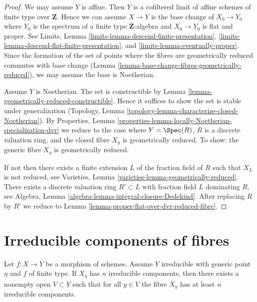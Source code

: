 \begin{proof}
We may assume $Y$ is affine. Then $Y$ is a cofiltered limit of affine
schemes of finite type over $\mathbf{Z}$.
Hence we can assume $X \to Y$ is the
base change of $X_0 \to Y_0$ where $Y_0$ is the spectrum of a finite
type $\mathbf{Z}$-algebra and $X_0 \to Y_0$ is flat and proper.
See Limits, Lemma \ref{limits-lemma-descend-finite-presentation},
\ref{limits-lemma-descend-flat-finite-presentation}, and
\ref{limits-lemma-eventually-proper}. Since the formation of
the set of points where the fibres are geometrically
reduced commutes with base change
(Lemma \ref{lemma-base-change-fibres-geometrically-reduced}),
we may assume the base is Noetherian.

\medskip\noindent
Assume $Y$ is Noetherian. The set is constructible by
Lemma \ref{lemma-geometrically-reduced-constructible}.
Hence it suffices to show the set is stable under generalization
(Topology, Lemma \ref{topology-lemma-characterize-closed-Noetherian}). By
Properties, Lemma \ref{properties-lemma-locally-Noetherian-specialization-dvr}
we reduce to the case where $Y = \Spec(R)$, $R$ is a discrete
valuation ring, and the closed fibre $X_y$ is geometrically
reduced. To show: the generic fibre $X_\eta$ is geometrically reduced.

\medskip\noindent
If not then there exists a finite extension $L$ of the fraction
field of $R$ such that $X_L$ is not reduced, see
Varieties, Lemma \ref{varieties-lemma-geometrically-reduced}.
There exists a discrete valuation ring
$R' \subset L$ with fraction field $L$ dominating $R$, see
Algebra, Lemma \ref{algebra-lemma-integral-closure-Dedekind}.
After replacing $R$ by $R'$ we reduce to
Lemma \ref{lemma-proper-flat-over-dvr-reduced-fibre}.
\end{proof}







\section{Irreducible components of fibres}
\label{section-irreducible}

\begin{lemma}
\label{lemma-irreducible-components-in-neighbourhood}
Let $f : X \to Y$ be a morphism of schemes. Assume $Y$ irreducible with
generic point $\eta$ and $f$ of finite type. If $X_\eta$ has $n$
irreducible components, then there exists a nonempty open $V \subset Y$
such that for all $y \in V$ the fibre $X_y$ has at least $n$
irreducible components.
\end{lemma}

